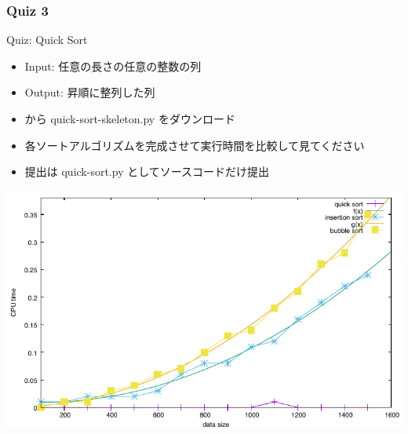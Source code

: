 \begin{frame}[shrink]
\frametitle{Quiz 3}
  \begin{block}{Quiz: Quick Sort}
\scriptsize
    \begin{itemize}
\item Input: 任意の長さの任意の整数の列
\item Output: 昇順に整列した列
\item \href{https://sites.google.com/presystems.xyz/elementaryCS/}{} から quick-sort-skeleton.py をダウンロード
\item 各ソートアルゴリズムを完成させて実行時間を比較して見てください
\item 提出は quick-sort.py としてソースコードだけ提出
    \end{itemize}
  \end{block}
  \begin{center}
\includegraphics[scale=0.6]{./progs/sort.pdf}
  \end{center}
\end{frame}
